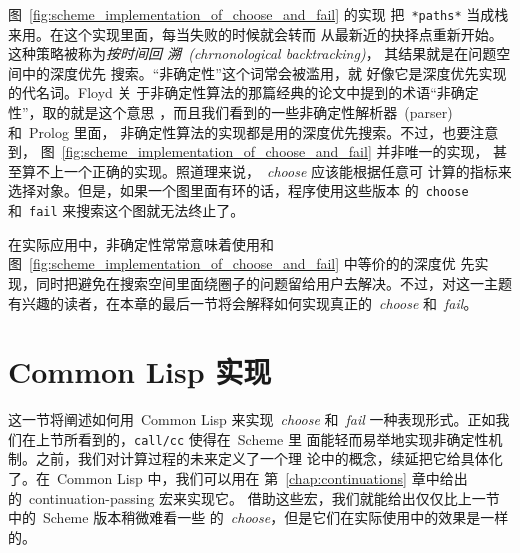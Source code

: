 图~\ref{fig:scheme_implementation_of_choose_and_fail} 的实现
把~\texttt{*paths*} 当成栈来用。在这个实现里面，每当失败的时候就会转而
从最新近的抉择点重新开始。这种策略被称为\emph{按时间回
  溯~(chrnonological backtracking)}，
其结果就是在问题空间中的深度优先
搜索。``非确定性''这个词常会被滥用，就
好像它是深度优先实现的代名词。Floyd 关
于非确定性算法的那篇经典的论文中提到的术语``非确定性''，取的就是这个意思
，而且我们看到的一些非确定性解析器~(parser) 和~Prolog 里面，
非确定性算法的实现都是用的深度优先搜索。不过，也要注意到，
图~\ref{fig:scheme_implementation_of_choose_and_fail} 并非唯一的实现，
甚至算不上一个正确的实现。照道理来说，~\emph{choose} 应该能根据任意可
计算的指标来选择对象。但是，如果一个图里面有环的话，程序使用这些版本
的~\texttt{choose} 和~\texttt{fail} 来搜索这个图就无法终止了。

在实际应用中，非确定性常常意味着使用和
图~\ref{fig:scheme_implementation_of_choose_and_fail} 中等价的的深度优
先实现，同时把避免在搜索空间里面绕圈子的问题留给用户去解决。不过，对这一主题
有兴趣的读者，在本章的最后一节将会解释如何实现真正的~\emph{choose}
和~\emph{fail}。

\section{Common Lisp 实现}
\label{sec:common_lisp_implementation}

这一节将阐述如何用~Common Lisp 来实现~\emph{choose} 和~\emph{fail}
一种表现形式。正如我们在上节所看到的，\texttt{call/cc} 使得在~Scheme 里
面能轻而易举地实现非确定性机制。之前，我们对计算过程的未来定义了一个理
论中的概念，续延把它给具体化了。在~Common Lisp 中，我们可以用在
第~\ref{chap:continuations} 章中给出的~continuation-passing 宏来实现它。
借助这些宏，我们就能给出仅仅比上一节中的~Scheme 版本稍微难看一些
的~\emph{choose}，但是它们在实际使用中的效果是一样的。

